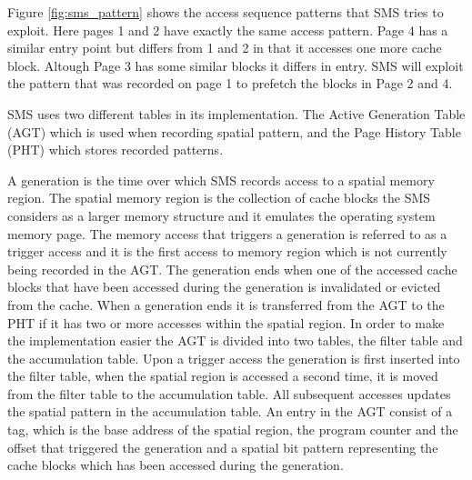 Figure \ref{fig:sms_pattern} shows the access sequence patterns that SMS tries to exploit. Here pages 1 and 2 have exactly the same access pattern. Page 4 has a similar entry point but differs from 1 and 2 in that it accesses one more cache block. Altough Page 3 has some similar blocks it differs in entry. SMS will exploit the pattern that was recorded on page 1 to prefetch the blocks in Page 2 and 4.
\newline

SMS uses two different tables in its implementation. The Active
Generation Table (AGT) which is used when recording spatial pattern,
and the Page History Table (PHT) which stores recorded patterns. 

A generation is the time over which SMS records access to a spatial
memory region. The spatial memory region is the collection of cache
blocks the SMS considers as a larger memory structure and it emulates
the operating system memory page. The memory access that triggers a
generation is referred to as a trigger access and it is the first
access to memory region which is not currently being recorded in the
AGT. The generation ends when one of the accessed cache blocks that
have been accessed during the generation is invalidated or evicted
from the cache.  When a generation ends it is transferred from the AGT
to the PHT if it has two or more accesses within the spatial
region. In order to make the implementation easier the AGT is divided
into two tables, the filter table and the accumulation table.  Upon a
trigger access the generation is first inserted into the filter table,
when the spatial region is accessed a second time, it is moved from
the filter table to the accumulation table. All subsequent accesses
updates the spatial pattern in the accumulation table.  An entry in
the AGT consist of a tag, which is the base address of the spatial
region, the program counter and the offset that triggered the
generation and a spatial bit pattern representing the cache blocks which has been
accessed during the generation. 

